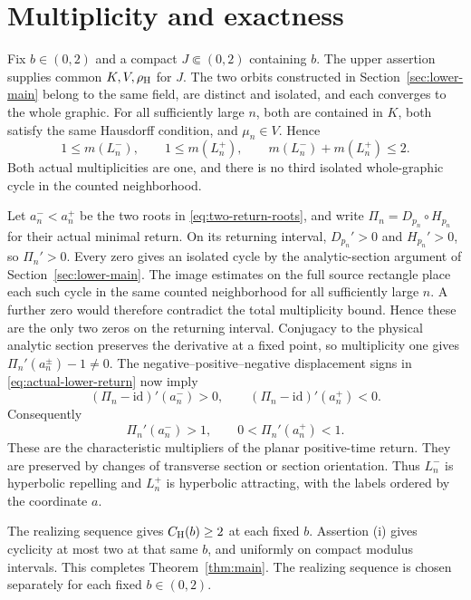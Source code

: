 \section{Multiplicity and exactness}
\label{sec:combination}
Fix $b\in(0,2)$ and a compact $J\Subset(0,2)$ containing $b$.
The upper assertion supplies common $K,V,\rho_{\rm H}$ for $J$.
The two orbits constructed in Section~\ref{sec:lower-main}
belong to the same field, are distinct and isolated, and each
converges to the whole graphic. For all sufficiently large $n$,
both are contained in $K$, both satisfy the same Hausdorff
condition, and $\mu_n\in V$. Hence
\[
 1\le m(L_n^-),\qquad 1\le m(L_n^+),\qquad
 m(L_n^-)+m(L_n^+)\le2 .
\]
Both actual multiplicities are one, and there is no third isolated
whole-graphic cycle in the counted neighborhood.

Let $a_n^-<a_n^+$ be the two roots in
\eqref{eq:two-return-roots}, and write $\Pi_n=D_{p_n}\circ H_{p_n}$
for their actual minimal return. On its returning interval,
$D_{p_n}'>0$ and $H_{p_n}'>0$, so $\Pi_n'>0$.
Every zero gives an isolated cycle by the analytic-section argument
of Section~\ref{sec:lower-main}. The image estimates on the full
source rectangle place each such cycle in the same counted
neighborhood for all sufficiently large $n$. A further zero would
therefore contradict the total multiplicity bound. Hence these are
the only two zeros on the returning interval. Conjugacy to the
physical analytic section preserves the derivative at a fixed
point, so multiplicity one gives $\Pi_n'(a_n^\pm)-1\ne0$.
The negative--positive--negative displacement signs in
\eqref{eq:actual-lower-return} now imply
\[
 (\Pi_n-\mathrm{id})'(a_n^-)>0,\qquad
 (\Pi_n-\mathrm{id})'(a_n^+)<0.
\]
Consequently
\begin{equation}\label{eq:realizing-multipliers}
 \Pi_n'(a_n^-)>1,\qquad 0<\Pi_n'(a_n^+)<1.
\end{equation}
These are the characteristic multipliers of the planar positive-time
return. They are preserved by changes of transverse section or
section orientation. Thus $L_n^-$ is hyperbolic repelling and $L_n^+$
is hyperbolic attracting, with the labels ordered by the coordinate $a$.

The realizing sequence gives $C_{\rm H}(b)\ge2$ at each fixed
$b$. Assertion (i) gives cyclicity at most two at that same $b$,
and uniformly on compact modulus intervals. This completes
Theorem~\ref{thm:main}. The realizing sequence is chosen separately
for each fixed $b\in(0,2)$.
